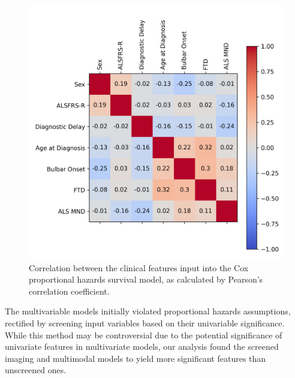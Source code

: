 \begin{figure}
    \centering
    \includegraphics[width=0.75\linewidth]{figures/clinical_correlation}
    \caption{Correlation between the clinical features input into the Cox proportional hazards survival model, as calculated by Pearson's correlation coefficient.}
    \label{fig:clinicalcorrelation}
\end{figure}

The multivariable models initially violated proportional hazards assumptions, rectified by screening input variables based on their univariable significance.
While this method may be controversial due to the potential significance of univariate features in multivariate models, our analysis found the screened imaging and multimodal models to yield more significant features than unscreened ones.

